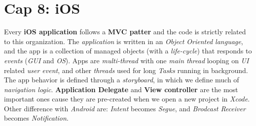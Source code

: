 \documentclass{article}
\begin{document}
\section{Cap 8: iOS}
Every \textbf{iOS application} follows a \textbf{MVC patter} and the code is strictly related to this organization. The \emph{application} is written in an \emph{Object Oriented language}, and the app is a collection of managed objects (with a \emph{life-cycle}) that responds to \emph{events} (\emph{GUI} and \emph{OS}). Apps are \emph{multi-thread} with one \emph{main thread} looping on \emph{UI} related \emph{user event}, and other \emph{threads} used for long \emph{Tasks} running in background. The app behavior is defined through a \emph{storyboard}, in which we define much of \emph{navigation logic}. \textbf{Application Delegate} and \textbf{View controller} are the most important ones cause they are pre-created when we open a new project in \emph{Xcode}. Other difference with \emph{Android} are: \emph{Intent} becomes \emph{Segue}, and \emph{Brodcast Receiver} becomes \emph{Notification}.
\end{document}
